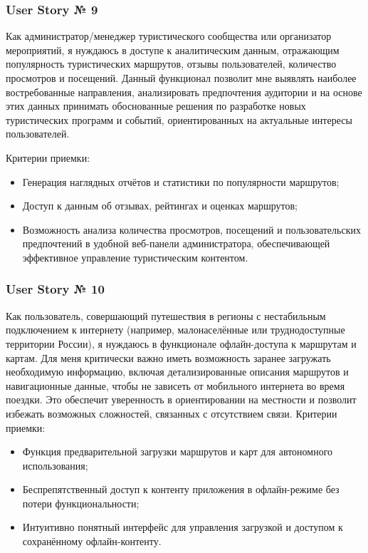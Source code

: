 \subsubsection*{User Story № 9} 
Как администратор/менеджер туристического сообщества или организатор мероприятий, я нуждаюсь в доступе к аналитическим данным, отражающим популярность туристических маршрутов, отзывы пользователей, количество просмотров и посещений. Данный функционал позволит мне выявлять наиболее востребованные направления, анализировать предпочтения аудитории и на основе этих данных принимать обоснованные решения по разработке новых туристических программ и событий, ориентированных на актуальные интересы пользователей.

Критерии приемки:
\begin{itemize}
    \item Генерация наглядных отчётов и статистики по популярности маршрутов;
    \item Доступ к данным об отзывах, рейтингах и оценках маршрутов;
    \item Возможность анализа количества просмотров, посещений и пользовательских предпочтений в удобной веб-панели администратора, обеспечивающей эффективное управление туристическим контентом.
\end{itemize}

\subsubsection*{User Story № 10} 
Как пользователь, совершающий путешествия в регионы с нестабильным подключением к интернету (например, малонаселённые или труднодоступные территории России), я нуждаюсь в функционале офлайн-доступа к маршрутам и картам. Для меня критически важно иметь возможность заранее загружать необходимую информацию, включая детализированные описания маршрутов и навигационные данные, чтобы не зависеть от мобильного интернета во время поездки. Это обеспечит уверенность в ориентировании на местности и позволит избежать возможных сложностей, связанных с отсутствием связи.
Критерии приемки:
\begin{itemize}
    \item 	Функция предварительной загрузки маршрутов и карт для автономного использования;
    \item 	Беспрепятственный доступ к контенту приложения в офлайн-режиме без потери функциональности;
    \item 	Интуитивно понятный интерфейс для управления загрузкой и доступом к сохранённому офлайн-контенту.
\end{itemize}



